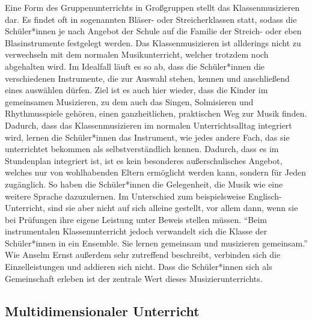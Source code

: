 Eine Form des Gruppenunterrichts in Großgruppen stellt das Klassenmusizieren
dar. Es findet oft in sogenannten Bläser- oder Streicherklassen statt, sodass
die Schüler*innen je nach Angebot der Schule auf die Familie der Streich- oder
eben Blasinstrumente festgelegt werden. Das Klassenmusizieren ist allderings
nicht zu verwechseln mit dem normalen Musikunterricht, welcher trotzdem noch
abgehalten wird. Im Idealfall läuft es so ab, dass die Schüler*innen die
verschiedenen Instrumente, die zur Auswahl stehen, kennen und anschließend eines
auswählen dürfen. Ziel ist es auch hier wieder, dass die Kinder im gemeinsamen
Musizieren, zu dem auch das Singen, Solmisieren und Rhythmusspiele gehören,
einen ganzheitlichen, praktischen Weg zur Musik finden.
\autocite[91]{ernst:die_zukunftsfaehige_musikschule} Dadurch, dass das
Klassenmusizieren im normalen Unterrichtsalltag integriert wird, lernen die
Schüler*innen das Instrument, wie jedes andere Fach, das sie unterrichtet
bekommen als selbstverständlich kennen. Dadurch, dass es im Stundenplan
integriert ist, ist es kein besonderes außerschulisches Angebot, welches nur von
wohlhabenden Eltern ermöglicht werden kann, sondern für Jeden zugänglich. So
haben die Schüler*innen die Gelegenheit, die Musik wie eine weitere Sprache
dazuzulernen. Im Unterschied zum beispielsweise Englisch-Unterricht, sind sie
aber nicht auf sich alleine gestellt, vor allem dann, wenn sie bei Prüfungen
ihre eigene Leistung unter Beweis stellen müssen. \enquote{Beim instrumentalen
Klassenunterricht jedoch verwandelt sich die Klasse der Schüler*innen in ein
Ensemble. Sie lernen gemeinsam und musizieren gemeinsam.}
\autocite[92]{ernst:die_zukunftsfaehige_musikschule} Wie Anselm Ernst außerdem
sehr zutreffend beschreibt, verbinden sich die Einzelleistungen und addieren
sich nicht. Dass die Schüler*innen sich als Gemeinschaft erleben ist der
zentrale Wert dieses Musizierunterrichts.








\subsection{Multidimensionaler Unterricht} 

